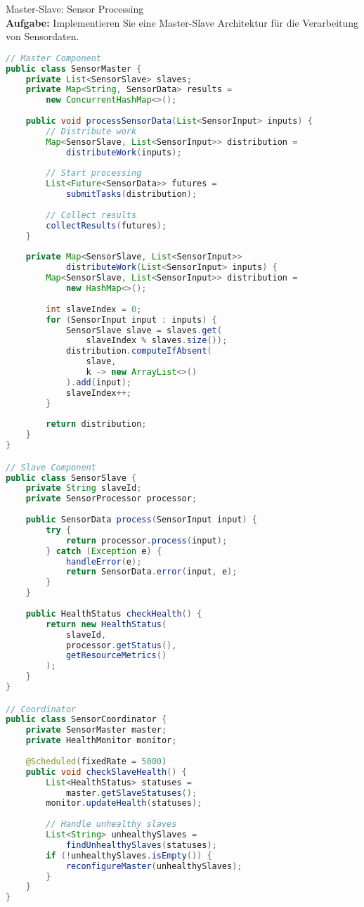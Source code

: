\begin{example2}{Master-Slave: Sensor Processing}\\
\textbf{Aufgabe:} Implementieren Sie eine Master-Slave Architektur für die Verarbeitung von Sensordaten.

\begin{lstlisting}[language=Java, style=basesmol]
// Master Component
public class SensorMaster {
    private List<SensorSlave> slaves;
    private Map<String, SensorData> results = 
        new ConcurrentHashMap<>();
    
    public void processSensorData(List<SensorInput> inputs) {
        // Distribute work
        Map<SensorSlave, List<SensorInput>> distribution = 
            distributeWork(inputs);
            
        // Start processing
        List<Future<SensorData>> futures = 
            submitTasks(distribution);
            
        // Collect results
        collectResults(futures);
    }
    
    private Map<SensorSlave, List<SensorInput>> 
            distributeWork(List<SensorInput> inputs) {
        Map<SensorSlave, List<SensorInput>> distribution = 
            new HashMap<>();
            
        int slaveIndex = 0;
        for (SensorInput input : inputs) {
            SensorSlave slave = slaves.get(
                slaveIndex % slaves.size());
            distribution.computeIfAbsent(
                slave, 
                k -> new ArrayList<>()
            ).add(input);
            slaveIndex++;
        }
        
        return distribution;
    }
}

// Slave Component
public class SensorSlave {
    private String slaveId;
    private SensorProcessor processor;
    
    public SensorData process(SensorInput input) {
        try {
            return processor.process(input);
        } catch (Exception e) {
            handleError(e);
            return SensorData.error(input, e);
        }
    }
    
    public HealthStatus checkHealth() {
        return new HealthStatus(
            slaveId,
            processor.getStatus(),
            getResourceMetrics()
        );
    }
}

// Coordinator
public class SensorCoordinator {
    private SensorMaster master;
    private HealthMonitor monitor;
    
    @Scheduled(fixedRate = 5000)
    public void checkSlaveHealth() {
        List<HealthStatus> statuses = 
            master.getSlaveStatuses();
        monitor.updateHealth(statuses);
        
        // Handle unhealthy slaves
        List<String> unhealthySlaves = 
            findUnhealthySlaves(statuses);
        if (!unhealthySlaves.isEmpty()) {
            reconfigureMaster(unhealthySlaves);
        }
    }
}
\end{lstlisting}
\end{example2}

